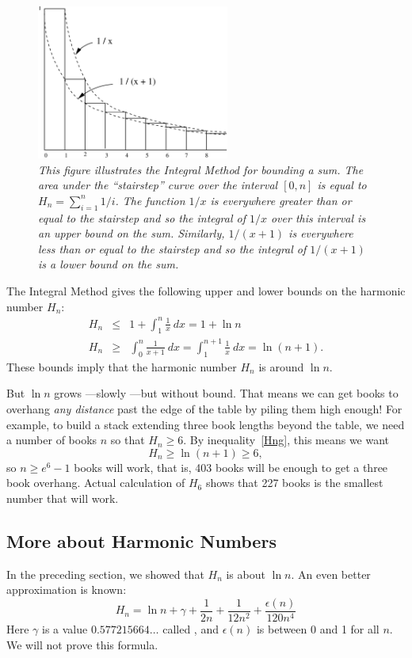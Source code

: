 \begin{figure}[htbp]
\centerline{\includegraphics[height=2.0in]{figures/integral}}
\caption{\em This figure illustrates the Integral Method for bounding
a sum.  The area under the ``stairstep'' curve over the interval $[0,
n]$ is equal to $H_n = \sum_{i=1}^n 1/i$.  The function $1/x$ is
everywhere greater than or equal to the stairstep and so the integral
of $1/x$ over this interval is an upper bound on the sum.  Similarly,
$1/(x+1)$ is everywhere less than or equal to the stairstep and so the
integral of $1/(x+1)$ is a lower bound on the sum.}
\label{fig:integral}
\end{figure}

The Integral Method gives the following upper and lower bounds on the
harmonic number $H_n$:
\begin{eqnarray}
H_n & \leq & 1 + \int_1^n \frac{1}{x} \ dx = 1 + \ln n \label{Hnl}\\
H_n & \geq & \int_0^n \frac{1}{x+1} \ dx = \int_1^{n+1} \frac{1}{x} \ dx = \ln(n+1).\label{Hng}
\end{eqnarray}
These bounds imply that the harmonic number $H_n$ is around $\ln n$.

But $\ln n$ grows ---slowly ---but without bound.  That means we can get
books to overhang \emph{any distance} past the edge of the table by piling
them high enough!  For example, to build a stack extending three book
lengths beyond the table, we need a number of books $n$ so that $H_n \ge
6$.  By inequality~\eqref{Hng}, this means we want
\[
H_n \geq \ln(n+1) \geq 6,
\]
so $n \geq e^6-1$ books will work, that is, 403 books will be enough to
get a three book overhang.  Actual calculation of $H_6$ shows that 227
books is the smallest number that will work.

\subsection{More about Harmonic Numbers}

In the preceding section, we showed that $H_n$ is about $\ln n$.  An
even better approximation is known:
\[
H_n = \ln n + \gamma + \frac{1}{2n} + \frac{1}{12n^2} +
        \frac{\epsilon(n)}{120n^4}
\]
Here $\gamma$ is a value $0.577215664\dots$ called , and $\epsilon(n)$ is between 0 and 1 for all $n$.  We will
not prove this formula.

